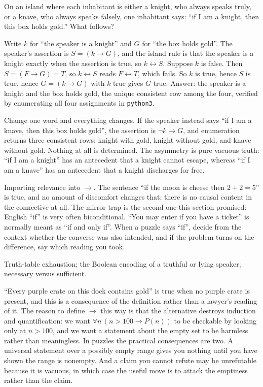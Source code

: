 \begin{worked}
On an island where each inhabitant is either a knight, who always speaks truly, or a knave, who always speaks falsely, one inhabitant says: ``if I am a knight, then this box holds gold.'' What follows?

Write $k$ for ``the speaker is a knight'' and $G$ for ``the box holds gold''. The speaker's assertion is $S=(k\to G)$, and the island rule is that the speaker is a knight exactly when the assertion is true, so $k\leftrightarrow S$. Suppose $k$ is false. Then $S=(F\to G)=T$, so $k\leftrightarrow S$ reads $F\leftrightarrow T$, which fails. So $k$ is true, hence $S$ is true, hence $G=(k\to G)$ with $k$ true gives $G$ true. Answer: the speaker is a knight and the box holds gold, the unique consistent row among the four, verified by enumerating all four assignments in \texttt{python3}.

Change one word and everything changes. If the speaker instead says ``if I am a knave, then this box holds gold'', the assertion is $\lnot k\to G$, and enumeration returns three consistent rows: knight with gold, knight without gold, and knave without gold. Nothing at all is determined. The asymmetry is pure vacuous truth: ``if I am a knight'' has an antecedent that a knight cannot escape, whereas ``if I am a knave'' has an antecedent that a knight discharges for free.
\end{worked}

\begin{trap}
Importing relevance into $\to$. The sentence ``if the moon is cheese then $2+2=5$'' is true, and no amount of discomfort changes that; there is no causal content in the connective at all. The mirror trap is the second one this section promised: English ``if'' is very often biconditional. ``You may enter if you have a ticket'' is normally meant as ``if and only if''. When a puzzle says ``if'', decide from the context whether the converse was also intended, and if the problem turns on the difference, say which reading you took.
\end{trap}

\begin{seealsob}Truth-table exhaustion; the Boolean encoding of a truthful or lying speaker; necessary versus sufficient.\end{seealsob}

\begin{keynote}
``Every purple crate on this dock contains gold'' is true when no purple crate is present, and this is a consequence of the definition rather than a lawyer's reading of it. The reason to define $\to$ this way is that the alternative destroys induction and quantification: we want $\forall n\,(n>100\to P(n))$ to be checkable by looking only at $n>100$, and we want a statement about the empty set to be harmless rather than meaningless. In puzzles the practical consequences are two. A universal statement over a possibly empty range gives you nothing until you have shown the range is nonempty. And a claim you cannot refute may be unrefutable because it is vacuous, in which case the useful move is to attack the emptiness rather than the claim.
\end{keynote}

